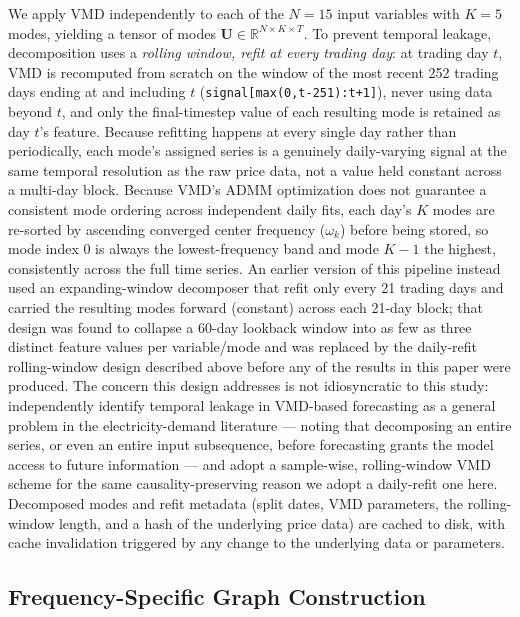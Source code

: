 \documentclass[journal]{IEEEtran}
\begin{document}
We apply VMD independently to each of the $N=15$ input variables with $K=5$ modes, yielding a tensor of modes $\mathbf{U} \in \mathbb{R}^{N \times K \times T}$. To prevent temporal leakage, decomposition uses a \emph{rolling window, refit at every trading day}: at trading day $t$, VMD is recomputed from scratch on the window of the most recent 252 trading days ending at and including $t$ (\texttt{signal[max(0,t-251):t+1]}), never using data beyond $t$, and only the final-timestep value of each resulting mode is retained as day $t$'s feature. Because refitting happens at every single day rather than periodically, each mode's assigned series is a genuinely daily-varying signal at the same temporal resolution as the raw price data, not a value held constant across a multi-day block. Because VMD's ADMM optimization does not guarantee a consistent mode ordering across independent daily fits, each day's $K$ modes are re-sorted by ascending converged center frequency ($\omega_k$) before being stored, so mode index 0 is always the lowest-frequency band and mode $K-1$ the highest, consistently across the full time series. An earlier version of this pipeline instead used an expanding-window decomposer that refit only every 21 trading days and carried the resulting modes forward (constant) across each 21-day block; that design was found to collapse a 60-day lookback window into as few as three distinct feature values per variable/mode and was replaced by the daily-refit rolling-window design described above before any of the results in this paper were produced. The concern this design addresses is not idiosyncratic to this study: \citet{Feng2026} independently identify temporal leakage in VMD-based forecasting as a general problem in the electricity-demand literature --- noting that decomposing an entire series, or even an entire input subsequence, before forecasting grants the model access to future information --- and adopt a sample-wise, rolling-window VMD scheme for the same causality-preserving reason we adopt a daily-refit one here. Decomposed modes and refit metadata (split dates, VMD parameters, the rolling-window length, and a hash of the underlying price data) are cached to disk, with cache invalidation triggered by any change to the underlying data or parameters.

\subsection{Frequency-Specific Graph Construction}
\label{sec:graph}
\end{document}

